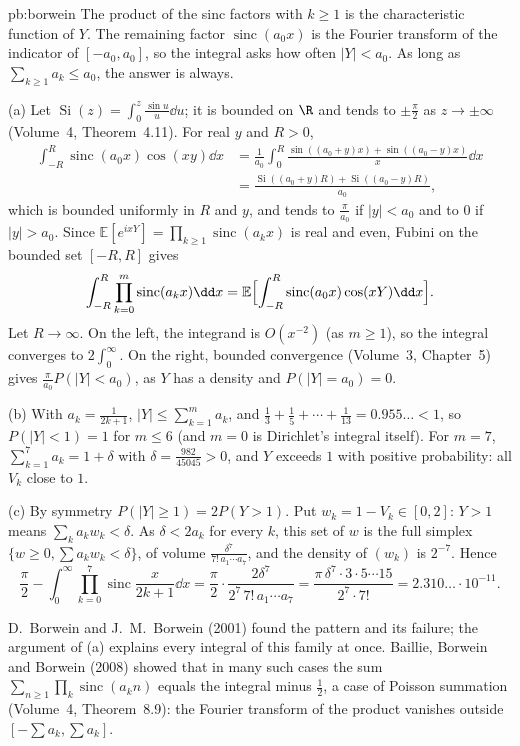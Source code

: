 \begin{solution}{pb:borwein}
\idea The product of the sinc factors with $k\ge1$ is the characteristic function of $Y$. The remaining factor $\operatorname{sinc}(a_0x)$ is the
Fourier transform of the indicator of $[-a_0,a_0]$, so the integral asks how often $|Y|<a_0$. As long as $\sum_{k\ge1}a_k\le a_0$, the answer
is always.

\writeup (a) Let $\operatorname{Si}(z)=\int_0^z\frac{\sin u}u\dd u$; it is bounded on $\R$ and tends to $\pm\frac\pi2$ as $z\to\pm\infty$ (Volume~4, Theorem~4.11). For real $y$
and $R>0$,
\[
\begin{aligned}\int_{-R}^R\operatorname{sinc}(a_0x)\cos(xy)\dd x&=\frac1{a_0}\int_0^R\frac{\sin((a_0+y)x)+\sin((a_0-y)x)}x\dd x\\&=\frac{\operatorname{Si}((a_0+y)R)+\operatorname{Si}((a_0-y)R)}{a_0},\end{aligned}
\]
which is bounded uniformly in $R$ and $y$, and tends to $\frac\pi{a_0}$ if $|y|<a_0$ and to $0$ if $|y|>a_0$. Since $\mathbb E[e^{ixY}]=\prod_{k\ge1}\operatorname{sinc}(a_kx)$
is real and even, Fubini on the bounded set $[-R,R]$ gives
\[
\int_{-R}^R\prod_{k=0}^m\operatorname{sinc}(a_kx)\dd x=\mathbb E\Bigl[\int_{-R}^R\operatorname{sinc}(a_0x)\cos(xY)\dd x\Bigr].
\]
Let $R\to\infty$. On the left, the integrand is $O(x^{-2})$ (as $m\ge1$), so the integral converges to $2\int_0^\infty$. On the right,
bounded convergence (Volume~3, Chapter~5) gives $\frac\pi{a_0}P(|Y|<a_0)$, as $Y$ has a density and $P(|Y|=a_0)=0$.

(b) With $a_k=\frac1{2k+1}$, $|Y|\le\sum_{k=1}^ma_k$, and $\frac13+\frac15+\cdots+\frac1{13}=0.955\ldots<1$, so $P(|Y|<1)=1$ for $m\le6$ (and $m=0$ is
Dirichlet's integral itself). For $m=7$, $\sum_{k=1}^7a_k=1+\delta$ with $\delta=\frac{982}{45045}>0$, and $Y$ exceeds $1$ with positive probability: all
$V_k$ close to $1$.

(c) By symmetry $P(|Y|\ge1)=2P(Y>1)$. Put $w_k=1-V_k\in[0,2]$: $Y>1$ means $\sum_ka_kw_k<\delta$. As $\delta<2a_k$ for every $k$, this set of
$w$ is the full simplex $\{w\ge0,\sum a_kw_k<\delta\}$, of volume $\frac{\delta^7}{7!\,a_1\cdots a_7}$, and the density of $(w_k)$ is $2^{-7}$. Hence
\[
\frac\pi2-\int_0^\infty\prod_{k=0}^7\operatorname{sinc}\frac x{2k+1}\dd x=\frac\pi2\cdot\frac{2\delta^7}{2^7\,7!\,a_1\cdots a_7}=\frac{\pi\,\delta^7\cdot3\cdot5\cdots15}{2^7\cdot7!}=2.310\ldots\cdot10^{-11}.
\]

\leads D.~Borwein and J.~M.~Borwein (2001) found the pattern and its failure; the argument of (a) explains every integral of this
family at once. Baillie, Borwein and Borwein (2008) showed that in many such cases the sum $\sum_{n\ge1}\prod_k\operatorname{sinc}(a_kn)$ equals the
integral minus $\frac12$, a case of Poisson summation (Volume~4, Theorem~8.9): the Fourier transform of the product vanishes outside
$[-\sum a_k,\sum a_k]$.
\end{solution}

